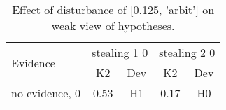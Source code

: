 \begin{table}\begin{tabular}{l|cc|cc}\toprule\multirow{2}{*}{Evidence} & \multicolumn{2}{c}{stealing 1 0}& \multicolumn{2}{c}{stealing 2 0}\\& {K2} & {Dev}& {K2} & {Dev}\\\midrule
no evidence, 0 & \cellcolor{Bittersweet}0.53&\cellcolor{Bittersweet}H1&\cellcolor{Bittersweet}0.17&\cellcolor{Bittersweet}H0\\\bottomrule\end{tabular}\caption{Effect of disturbance of [0.125, 'arbit'] on weak view of hypotheses.}\end{table}